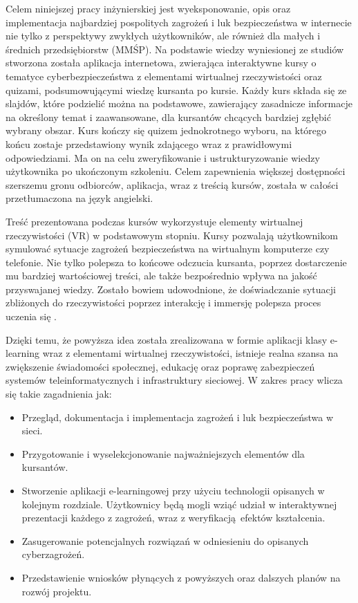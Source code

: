 \documentclass[12pt,twoside]{article}
\begin{document}
Celem niniejszej pracy inżynierskiej jest wyeksponowanie, opis oraz implementacja najbardziej pospolitych zagrożeń i luk bezpieczeństwa w internecie nie tylko z perspektywy zwykłych użytkowników, ale również dla małych i średnich przedsiębiorstw (MMŚP). Na podstawie wiedzy wyniesionej ze studiów stworzona została aplikacja internetowa, zwierająca interaktywne kursy o tematyce cyberbezpieczeństwa z elementami wirtualnej rzeczywistości oraz quizami, podsumowującymi wiedzę kursanta po kursie. Każdy kurs składa się ze slajdów, które podzielić można na podstawowe, zawierający zasadnicze informacje na określony temat i zaawansowane, dla kursantów chcących bardziej zgłębić wybrany obszar. Kurs kończy się quizem jednokrotnego wyboru, na którego końcu zostaje przedstawiony wynik zdającego wraz z prawidłowymi odpowiedziami. Ma on na celu zweryfikowanie i ustrukturyzowanie wiedzy użytkownika po ukończonym szkoleniu. Celem zapewnienia większej dostępności szerszemu gronu odbiorców, aplikacja, wraz z treścią kursów, została w całości przetłumaczona na język angielski.

Treść prezentowana podczas kursów wykorzystuje elementy wirtualnej rzeczywistości (VR) w podstawowym stopniu. Kursy pozwalają użytkownikom symulować sytuacje zagrożeń bezpieczeństwa na wirtualnym komputerze czy telefonie. Nie tylko polepsza to końcowe odczucia kursanta, poprzez dostarczenie mu bardziej wartościowej treści, ale także bezpośrednio wpływa na jakość przyswajanej wiedzy. Zostało bowiem udowodnione, że doświadczanie sytuacji zbliżonych do rzeczywistości poprzez interakcję i immersję polepsza proces uczenia się \cite{VrLearning}. 

Dzięki temu, że powyższa idea została zrealizowana w formie aplikacji klasy e-learning wraz z elementami wirtualnej rzeczywistości, istnieje realna szansa na zwiększenie świadomości społecznej, edukację oraz poprawę zabezpieczeń systemów teleinformatycznych i infrastruktury sieciowej. W zakres pracy wlicza się takie zagadnienia jak:
\begin{itemize}
\item Przegląd, dokumentacja i implementacja zagrożeń i luk bezpieczeństwa w sieci. 
\item Przygotowanie i wyselekcjonowanie najważniejszych elementów dla kursantów.
\item Stworzenie aplikacji e-learningowej przy użyciu technologii opisanych w kolejnym rozdziale. Użytkownicy będą mogli wziąć udział w interaktywnej prezentacji każdego z zagrożeń, wraz z weryfikacją efektów kształcenia.
\item Zasugerowanie potencjalnych rozwiązań w odniesieniu do opisanych cyberzagrożeń.
\item Przedstawienie wniosków płynących z powyższych oraz dalszych planów na rozwój projektu.\\
\end{itemize} 
\end{document}
